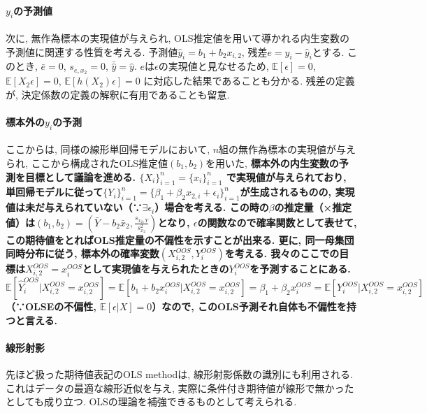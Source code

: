 \documentclass[paper=a4paper,fontsize=10pt]{jlreq}
\begin{document}
\paragraph{$y_i$の予測値}
次に, 無作為標本の実現値が与えられ, OLS推定値を用いて導かれる内生変数の予測値に関連する性質を考える. 予測値$\hat{y}_i=b_1+b_2x_{i, 2}$, 残差$e=y_i-\hat{y}_i$とする. このとき, $\bar{e}=0$, $s_{e, x_2}=0$, $\bar{\hat{y}}=\hat{y}$. $e$は$\epsilon$の実現値と見なせるため, $\mathbb{E}[\epsilon]=0$, $\mathbb{E}[X_{2}\epsilon]=0$, $\mathbb{E}[h(X_{2})\epsilon]=0$ に対応した結果であることも分かる. 残差の定義が, 決定係数の定義の解釈に有用であることも留意.\\

\paragraph{標本外の$y_i$の予測}
ここからは, 同様の線形単回帰モデルにおいて, $n$組の無作為標本の実現値が与えられ, ここから構成されたOLS推定値$(b_1, b_2)$を用いた, \rmfamily\mcfamily\bfseries{標本外}\mdseries の内生変数の予測を目標として議論を進める. $\{X_i\}_{i=1}^{n}=\{x_i\}_{i=1}^{n}$ で実現値が与えられており, 単回帰モデルに従って$\{Y_i\}_{i=1}^{n}=\{\beta_1+\beta_2x_{2,i}+\epsilon_i\}_{i=1}^{n}$が生成されるものの, 実現値は未だ与えられていない（∵$\exists\epsilon_i$）場合を考える. この時の$\beta$の推定量（×推定値）は$(b_1, b_2)=(\bar{Y}-b_2\bar{x}_2, \frac{s_{x_2,Y}}{s^{2}_{x_2}})$となり, $\epsilon$の関数なので確率関数として表せて, この期待値をとればOLS推定量の不偏性を示すことが出来る. 更に, 同一母集団同時分布に従う, 標本外の確率変数$(X_{i,2}^{OOS}, Y_i^{OOS})$を考える. 我々のここでの目標は$X_{i,2}^{OOS}=x_i^{OOS}$として実現値を与えられたときの$Y_i^{OOS}$を予測することにある. $\mathbb{E}[\hat{Y}_i^{OOS}|X_{i,2}^{OOS}=x_{i,2}^{OOS}]=\mathbb{E}[b_1+b_2x_i^{OOS}|X_{i,2}^{OOS}=x_{i,2}^{OOS}]=\beta_1+\beta_2x_i^{OOS}=\mathbb{E}[Y_i^{OOS}|X_{i,2}^{OOS}=x_{i,2}^{OOS}]$（∵OLSEの不偏性, $\mathbb{E}[\epsilon|X]=0$）なので, \rmfamily\mcfamily\bfseries{このOLS予測それ自体も不偏性を持つ}\mdseries と言える.\\

\paragraph{線形射影}
先ほど扱った期待値表記のOLS methodは, 線形射影係数の識別にも利用される. これはデータの最適な線形近似を与え, 実際に条件付き期待値が線形で無かったとしても成り立つ. OLSの理論を補強できるものとして考えられる. \\
\end{document}
